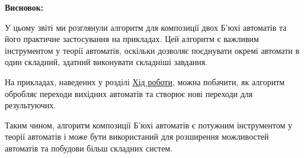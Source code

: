 \documentclass[12pt,a4paper]{article}
\newcommand{\textref}[2]{\hyperref[#1]{#2}}
\begin{document}
\vspace{1em}
\textbf{Висновок:}
\vspace{0.5em}

У цьому звіті ми розглянули алгоритм для композиції двох Б'юхі автоматів та його практичне застосування на прикладах. Цей алгоритм є важливим інструментом у теорії автоматів, оскільки дозволяє поєднувати окремі автомати в один складний, здатний виконувати складніші завдання.

На прикладах, наведених у розділі \textref{sec:progress}{Хід роботи}, можна побачити, як алгоритм обробляє переходи вихідних автоматів та створює нові переходи для результуючих.

Таким чином, алгоритм композиції Б'юхі автоматів є потужним інструментом у теорії автоматів і може бути використаний для розширення можливостей автоматів та побудови більш складних систем.
\end{document}
